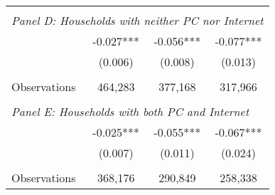 {\begin{tabular}{lccc}
&  &  &   \\
\multicolumn{4}{l}{\textit{Panel D: Households with neither PC nor Internet}} \\
\hspace{3mm}        &      -0.027***&      -0.056***&      -0.077***\\
                    &     (0.006)   &     (0.008)   &     (0.013)   \\
                    &               &               &               \\
\hspace{3mm}Observations&     464,283   &     377,168   &     317,966   \\
 
&  &  &   \\
\multicolumn{4}{l}{\textit{Panel E: Households with both PC and Internet}} \\
\hspace{3mm}        &      -0.025***&      -0.055***&      -0.067***\\
                    &     (0.007)   &     (0.011)   &     (0.024)   \\
                    &               &               &               \\
\hspace{3mm}Observations&     368,176   &     290,849   &     258,338   \\
 

\bottomrule
\end{tabular}
}
